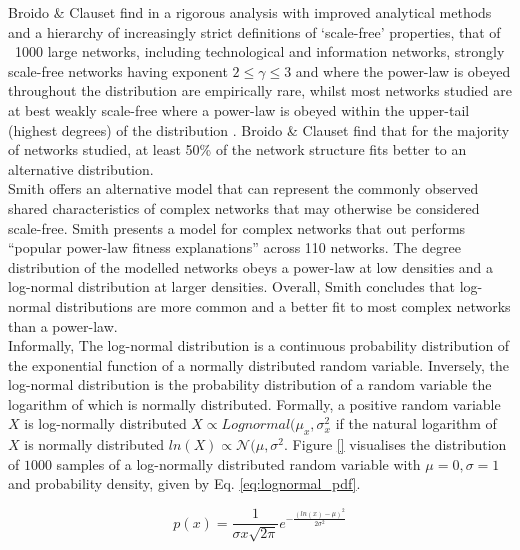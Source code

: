 \documentclass[
	a4paper, %
	10pt, %
	unnumberedsections, %
	twoside, %
]{LTJournalArticle}
\begin{document}
Broido \& Clauset find in a rigorous analysis with improved analytical methods and a hierarchy of increasingly strict definitions of `scale-free' properties, that of ~1000 large networks, including technological and information networks, strongly scale-free networks having exponent \(2 \leq \gamma \leq 3 \) and where the power-law is obeyed throughout the distribution are empirically rare, whilst most networks studied are at best weakly scale-free where a power-law is obeyed within the upper-tail (highest degrees) of the distribution \cite{broido:19}. Broido \& Clauset find that for the majority of networks studied, at least 50\% of the network structure fits better to an alternative distribution. \\

Smith \cite{smith:21} offers an alternative model that can represent the commonly observed shared characteristics of complex networks that may otherwise be considered scale-free. Smith presents a model for complex networks that out performs ``popular power-law fitness explanations'' across 110 networks. The degree distribution of the modelled networks obeys a power-law at low densities and a log-normal distribution at larger densities. Overall, Smith concludes that log-normal distributions are more common and a better fit to most complex networks than a power-law. \\

Informally, The log-normal distribution is a continuous probability distribution of the exponential function of a normally distributed random variable. Inversely, the log-normal distribution is the probability distribution of a random variable the logarithm of which is normally distributed. Formally, a positive random variable \(X\) is log-normally distributed \(X \propto Lognormal(\mu_{x}, \sigma_{x}^{2}\) if the natural logarithm of \(X\) is normally distributed \(ln(X) \propto \mathcal{N}(\mu, \sigma^{2}\). Figure \ref{} visualises the distribution of \( 1000 \) samples of a log-normally distributed random variable  with \( \mu = 0, \sigma = 1 \) and probability density, given by Eq. \ref{eq:lognormal_pdf}. 

\begin{equation}
	p(x) = \frac{1}{\sigma{x}\sqrt{2\pi}}e^{-\frac{(ln(x) - \mu)^{2}}{2\sigma^{2}}}
	\label{eq:lognormal_pdf}
\end{equation}
\end{document}
